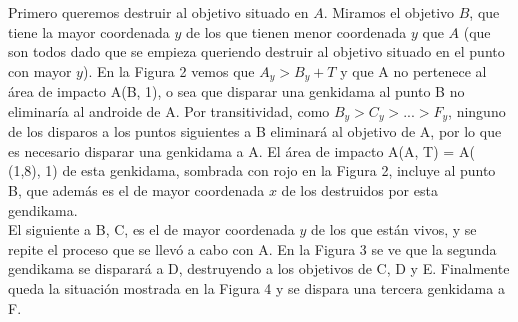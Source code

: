\documentclass[10pt,a4paper]{article}
\begin{document}
Primero queremos destruir al objetivo situado en $A$. Miramos el objetivo $B$, que tiene la mayor coordenada $y$ de los que tienen menor coordenada $y$ que $A$ (que son todos dado que se empieza queriendo destruir al objetivo situado en el punto con mayor $y$). En la Figura 2 vemos que $A_{y} > B_{y} + T$ y que A no pertenece al área de impacto A(B, 1), o sea que disparar una genkidama al punto B no eliminaría al androide de A. Por transitividad, como $B_{y} > C_{y} > ... > F_{y}$, ninguno de los disparos a los puntos siguientes a B eliminará al objetivo de A, por lo que es necesario disparar una genkidama a A. El área de impacto A(A, T) = A( (1,8), 1) de esta genkidama, sombrada con rojo en la Figura 2, incluye al punto B, que además es el de mayor coordenada $x$ de los destruidos por esta gendikama.\\
El siguiente a B, C, es el de mayor coordenada $y$ de los que están vivos, y se repite el proceso que se llevó a cabo con A. En la Figura 3 se ve que la segunda gendikama se disparará a D, destruyendo a los objetivos de C, D y E.
Finalmente queda la situación mostrada en la Figura 4 y se dispara una tercera genkidama a F.
\end{document}
